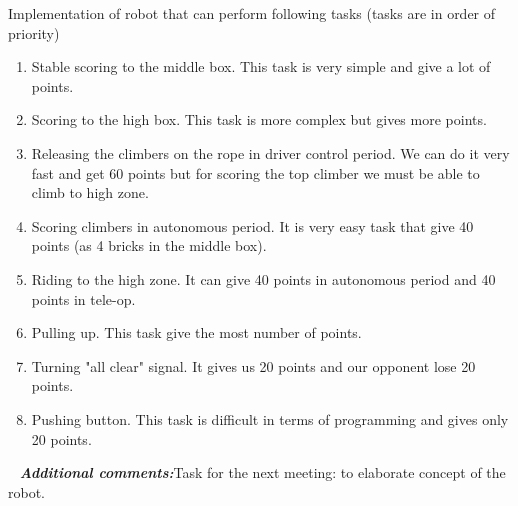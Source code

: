 \begin{enumerate*}
\begin{enumerate}
\begin{enumerate}
		\end{enumerate}
	\end{enumerate}
	\item Implementation of robot that can perform following tasks (tasks are in order of priority)
	\begin{enumerate}
		\item Stable scoring to the middle box. This task is very simple and give a lot of points.
		\item Scoring to the high box. This task is more complex but gives more points.
		\item Releasing the climbers on the rope in driver control period. We can do it very fast and get 60 points but for scoring the top climber we must be able to climb to high zone.
		\item Scoring climbers in autonomous period. It is very easy task that give 40 points (as 4 bricks in the middle box).
		\item Riding to the high zone. It can give 40 points in autonomous period and 40 points in tele-op.
		\item Pulling up. This task give the most number of points.
		\item Turning "all clear" signal. It gives us 20 points and our opponent lose 20 points.
		\item Pushing button. This task is difficult in terms of programming and gives only 20 points.
	\end{enumerate}
	
	 \newline
	\textit{\textbf{Additional comments:}}Task for the next meeting: to elaborate concept of the robot.
	
\end{enumerate*}





\fillpage
